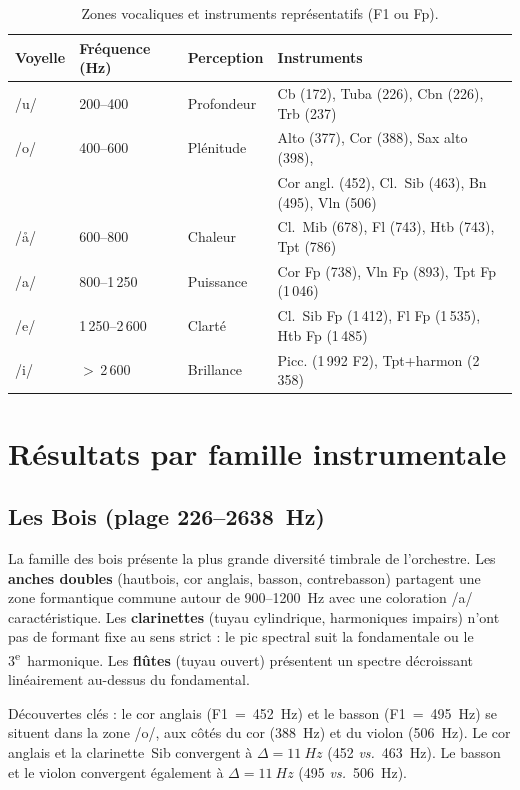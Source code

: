 \documentclass[11pt,a4paper]{article}
\begin{document}
\begin{table}[ht]
\centering
\caption{Zones vocaliques et instruments représentatifs (F1 ou Fp).}
\label{tab:voyelles}
\begin{tabular}{llll}
\toprule
Voyelle & Fréquence (Hz) & Perception & Instruments \\
\midrule
/u/ & 200--400 & Profondeur & Cb (172), Tuba (226), Cbn (226), Trb (237) \\
/o/ & 400--600 & Plénitude  & Alto (377), Cor (388), Sax alto (398), \\
    &          &            & Cor angl. (452), Cl.~Sib (463), Bn (495), Vln (506) \\
/\r{a}/ & 600--800 & Chaleur & Cl.~Mib (678), Fl (743), Htb (743), Tpt (786) \\
/a/ & 800--1\,250 & Puissance & Cor Fp (738), Vln Fp (893), Tpt Fp (1\,046) \\
/e/ & 1\,250--2\,600 & Clarté & Cl.~Sib Fp (1\,412), Fl Fp (1\,535), Htb Fp (1\,485) \\
/i/ & $>$\,2\,600 & Brillance & Picc. (1\,992 F2), Tpt+harmon (2\,358) \\
\bottomrule
\end{tabular}
\end{table}


\section{Résultats par famille instrumentale}

\subsection{Les Bois (plage 226--\SI{2638}{Hz})}

La famille des bois présente la plus grande diversité timbrale de
l'orchestre. Les \textbf{anches doubles} (hautbois, cor anglais, basson,
contrebasson) partagent une zone formantique commune autour de
900--\SI{1200}{Hz} avec une coloration /a/ caractéristique. Les
\textbf{clarinettes} (tuyau cylindrique, harmoniques impairs) n'ont pas
de formant fixe au sens strict : le pic spectral suit la fondamentale ou
le 3\textsuperscript{e}~harmonique. Les \textbf{flûtes} (tuyau ouvert)
présentent un spectre décroissant linéairement au-dessus du fondamental.

Découvertes clés : le cor anglais (F1~=~\SI{452}{Hz}) et le basson
(F1~=~\SI{495}{Hz}) se situent dans la zone /o/, aux côtés du cor
(\SI{388}{Hz}) et du violon (\SI{506}{Hz}). Le cor anglais et la
clarinette~Sib convergent à $\Delta = \SI{11}{Hz}$ (452 \emph{vs.}\
\SI{463}{Hz}). Le basson et le violon convergent également à $\Delta =
\SI{11}{Hz}$ (495 \emph{vs.}\ \SI{506}{Hz}).
\end{document}
